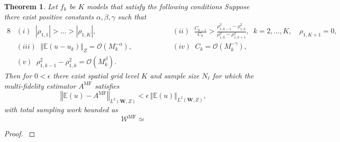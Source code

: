 \documentclass[final,3p,times,11pt]{elsarticle}
\newtheorem{theorem}{Theorem}%
\begin{document}
\begin{theorem}
\label{thm:Sample_cost_est}
Let $f_k$ be $K$ models that satisfy the following conditions
Suppose there exist positive constants $\alpha, \beta, \gamma$ such that
%
\begin{alignat*}{8}
    &(i)\;\; |\rho_{1,1}|>\ldots>|\rho_{1,K}|,& \qquad \qquad
    &(ii)\;\; \frac{C_{k-1}}{C_k}>\frac{\rho_{1,k-1}^2-\rho_{1,k}^2}{\rho_{1,k}^2-\rho_{1,k+1}^2},\;\;k=2,\ldots,K, \quad \rho_{1,K+1}=0,\\
    &(iii)\;\; \left\Vert\mathbb{E}\left(u-u_k\right)\right\Vert_Z=\mathcal{O}\left( M_k^{-\alpha}\right),& \qquad \qquad
    &(iv)\;\; C_k=\mathcal{O}\left( M_k^{-\gamma}\right),\\
    &(v)\;\; \rho_{1,k-1}^2-\rho_{1,k}^2=\mathcal{O}\left( M_k^{\beta}\right).
\end{alignat*}
%
%
Then for $0<\epsilon$ there exist spatial grid level $K$ and sample size $N_\ell$ for which the multi-fidelity estimator $A^{\text{MF}}$ satisfies
\[
\left\Vert\mathbb{E}(u)-A^{\text{MF}} \right\Vert_{L^2(\boldsymbol W,Z)}<\epsilon\,\left\Vert\mathbb{E}(u) \right\Vert_{L^2( \boldsymbol W,Z)},
\]
with total sampling work bounded as
\begin{equation*}
    \mathcal{W}^{\text{MF}} \simeq 
\end{equation*}
\end{theorem}
\begin{proof}\label{eq:Sample_cost_est}
\end{proof}
\end{document}
